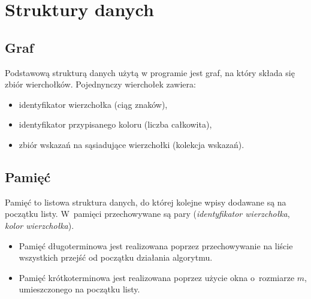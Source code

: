 \section{Struktury danych}
\subsection{Graf}
Podstawową strukturą danych użytą w programie jest graf, na który składa się zbiór wierchołków.
Pojednynczy wierchołek zawiera:
\begin{itemize}
 \item identyfikator wierzchołka (ciąg znaków),
 \item identyfikator przypisanego koloru (liczba całkowita),
 \item zbiór wskazań na sąsiadujące wierzchołki (kolekcja wskazań).
\end{itemize}

\subsection{Pamięć}
Pamięć to listowa struktura danych, do której kolejne wpisy dodawane są na początku listy. W~pamięci przechowywane są pary (\emph{identyfikator wierzchołka}, \emph{kolor wierzchołka}).

\begin{itemize}
 \item Pamięć długoterminowa jest realizowana poprzez przechowywanie na liście wszystkich przejść od początku działania algorytmu.
 \item Pamięć krótkoterminowa jest realizowana poprzez użycie okna o~rozmiarze $m$, umieszczonego na początku listy.
\end{itemize}
